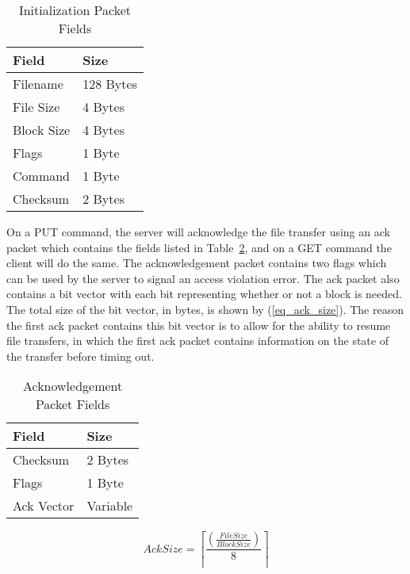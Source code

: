 \documentclass[journal]{./IEEEtran}
\begin{document}
\begin{table}[h!]
\caption{Initialization Packet Fields}
\label{table_init_packet}
\begin{center}
\begin{tabular}{|l|l|} \hline
\textbf{Field} & \textbf{Size} \\ \hline
Filename & 128 Bytes \\ \hline
File Size & 4 Bytes \\ \hline
Block Size & 4 Bytes \\ \hline
Flags & 1 Byte \\ \hline
Command & 1 Byte \\ \hline
Checksum & 2 Bytes \\ \hline
\end{tabular}
\end{center}
\end{table}

On a PUT command, the server will acknowledge the file transfer using an ack packet which contains the fields listed in Table~\ref{table_ack_packet}, and on a GET command the client will do the same.  The acknowledgement packet contains two flags which can be used by the server to signal an access violation error.  The ack packet also contains a bit vector with each bit representing whether or not a block is needed.  The total size of the bit vector, in bytes, is shown by (\ref{eq_ack_size}).  The reason the first ack packet contains this bit vector is to allow for the ability to resume file transfers, in which the first ack packet contains information on the state of the transfer before timing out.

\begin{table}[h!]
\caption{Acknowledgement Packet Fields}
\label{table_ack_packet}
\begin{center}
\begin{tabular}{|l|l|} \hline
\textbf{Field} & \textbf{Size} \\ \hline
Checksum & 2 Bytes \\ \hline
Flags & 1 Byte \\ \hline
Ack Vector & Variable \\ \hline
\end{tabular}
\end{center}
\end{table}

\begin{equation}
\label{eq_ack_size}
Ack Size =\left\lceil\frac{\left(\frac{File Size}{Block Size}\right)}{8}\right\rceil
\end{equation}
\end{document}
